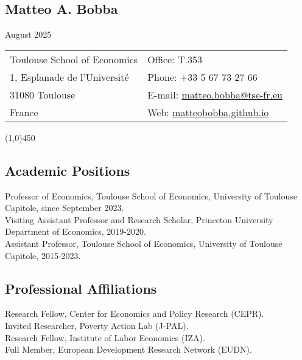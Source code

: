 \documentclass[12pt,english]{article}
\begin{document}


\noindent
\begin{center}
\section*{Matteo A. Bobba} \vspace{-0.3cm}
August 2025
\end{center} 
\begin{tabular}{p{9cm}p{9cm}}
Toulouse School of Economics &  Office: T.353  \\ 
1, Esplanade de l'Universit\'{e} & Phone: +33 5 67 73 27 66\\
31080 Toulouse  &  E-mail: \href{mailto: matteo.bobba@tse-fr.eu}{matteo.bobba@tse-fr.eu} \\
France & Web: \href{https://matteobobba.github.io/}{matteobobba.github.io}  \\
\end{tabular}
\vspace{-0.1cm}
\line(1,0){450} \\
\vspace{-0.3cm}

\subsection*{Academic Positions}
Professor of Economics, Toulouse School of Economics, University of Toulouse Capitole, since September 2023. \vspace{0.2cm} \\ 
Visiting Assistant Professor and Research Scholar, Princeton University Department of Economics, 2019-2020. \vspace{0.2cm} \\
Assistant Professor, Toulouse School of Economics, University of Toulouse Capitole, 2015-2023. 

\subsection*{Professional Affiliations}
Research Fellow, Center for Economics and Policy Research (CEPR).\vspace{0.2cm} \\
Invited Researcher, Poverty Action Lab (J-PAL). \vspace{0.2cm} \\ 
Research Fellow, Institute of Labor Economics (IZA). \vspace{0.2cm} \\ 
Full Member, European Development Research Network (EUDN).
\end{document}
